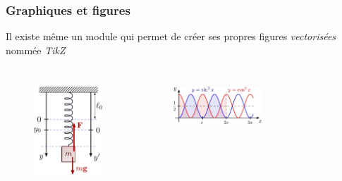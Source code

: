 \begin{frame}
    \frametitle{Graphiques et figures}
    Il existe même un module qui permet de créer ses propres figures \textit{vectorisées} nommée \textcolor{hard_green}{\textit{TikZ}}\footnotemark
    \vfill
    \pause
    \begin{columns}
        \begin{figure}
            \centering
            \includegraphics[width=0.55\linewidth]{./figures/tikz.png}
            \label{fig: tikz}
        \end{figure}
        \pause
        \begin{figure}
            \centering
            \includegraphics[width=0.9\linewidth]{./figures/tikz_2.png}
            \label{fig: tikz_2}
        \end{figure}
        \pause
        \begin{figure}
            \centering

\end{figure}
\end{columns}
\end{frame}
